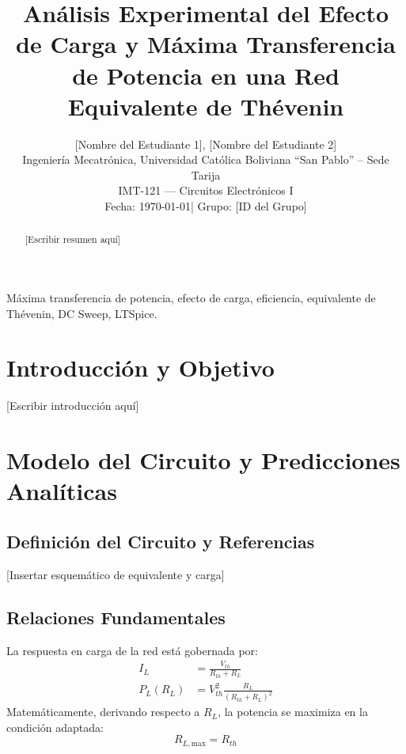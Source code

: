 \documentclass[journal, a4paper]{IEEEtran}
\begin{document}
\title{Análisis Experimental del Efecto de Carga y Máxima Transferencia de Potencia en una Red Equivalente de Thévenin}

\author{
    [Nombre del Estudiante 1], [Nombre del Estudiante 2]\\
    Ingeniería Mecatrónica, Universidad Católica Boliviana ``San Pablo'' -- Sede Tarija\\
    IMT-121 --- Circuitos Electrónicos I\\
    Fecha: \today \quad | \quad Grupo: [ID del Grupo]
}

\maketitle

\begin{abstract}
[Escribir resumen aquí]
\end{abstract}

\begin{IEEEkeywords}
Máxima transferencia de potencia, efecto de carga, eficiencia, equivalente de Thévenin, DC Sweep, LTSpice.
\end{IEEEkeywords}

\section{Introducción y Objetivo}
[Escribir introducción aquí]

\section{Modelo del Circuito y Predicciones Analíticas}

\subsection{Definición del Circuito y Referencias}
[Insertar esquemático de equivalente y carga]

\subsection{Relaciones Fundamentales}
La respuesta en carga de la red está gobernada por:
\begin{align}
    I_L &= \frac{V_{th}}{R_{th} + R_L} \\
    P_L(R_L) &= V_{th}^2 \frac{R_L}{(R_{th} + R_L)^2}
\end{align}
Matemáticamente, derivando respecto a $R_L$, la potencia se maximiza en la condición adaptada:
\begin{equation}
    R_{L,\text{max}} = R_{th}
\end{equation}
\end{document}

